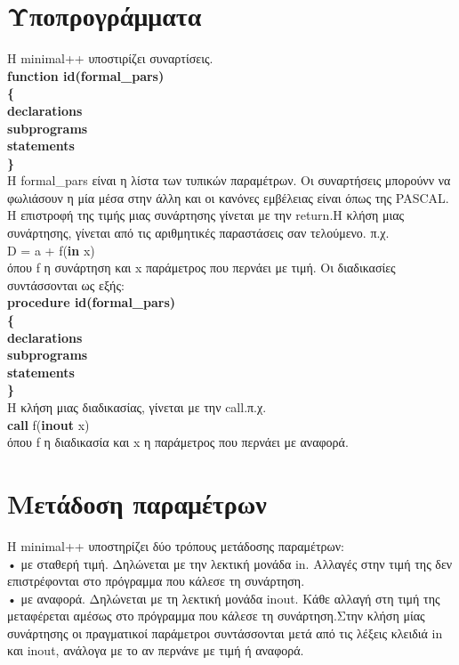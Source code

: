 \documentclass[12pt,a4paper,a4paper]{report}
\begin{document}
\section{Υποπρογράμματα}
Η minimal++ υποστιρίζει συναρτίσεις.\\
\textbf{function id(formal\_pars)\\\{\\\hspace*{10mm}declarations\\\hspace*{10mm}subprograms\\\hspace*{10mm}statements\\\}}\\
H formal\_pars είναι η λίστα των τυπικών παραμέτρων. Οι συναρτήσεις μπορούνν να φωλιάσουν η μία μέσα στην άλλη και οι κανόνες εμβέλειας είναι όπως της PASCAL. Η επιστροφή της τιμής μιας συνάρτησης γίνεται με την return.H κλήση μιας συνάρτησης, γίνεται από τις αριθμητικές παραστάσεις σαν τελούμενο. π.χ.\\
D =  a + f(\textbf{in} x)\\
όπου f η συνάρτηση και x παράμετρος που περνάει με τιμή. Οι διαδικασίες συντάσσονται ως εξής:\\
\textbf{procedure id(formal\_pars)\\\{\\\hspace*{10mm}declarations\\\hspace*{10mm}subprograms\\\hspace*{10mm}statements\\\}}\\
H κλήση μιας διαδικασίας, γίνεται με την call.π.χ.\\
\textbf{call} f(\textbf{inout} x)\\
όπου f η διαδικασία και x η παράμετρος που περνάει με αναφορά.\\

\section{Μετάδοση παραμέτρων}
 Η minimal++ υποστηρίζει δύο τρόπους μετάδοσης παραμέτρων:\\
  • με σταθερή τιμή. Δηλώνεται με την λεκτική μονάδα in. Αλλαγές στην τιμή της δεν επιστρέφονται στο πρόγραμμα που κάλεσε τη συνάρτηση.\\
  • με αναφορά. Δηλώνεται με τη λεκτική μονάδα inout. Κάθε αλλαγή στη τιμή της μεταφέρεται αμέσως στο πρόγραμμα που κάλεσε τη συνάρτηση.Στην κλήση μίας συνάρτησης οι πραγματικοί παράμετροι συντάσσονται μετά από τις λέξεις κλειδιά in και inout, ανάλογα με το αν περνάνε με τιμή ή αναφορά.\\
\end{document}
